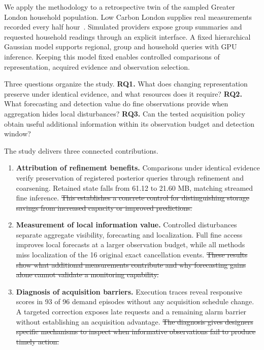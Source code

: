 \documentclass[conference]{IEEEtran}
\providecommand{\DIFdeltex}[1]{{\protect\color{red}\sout{#1}}}                      %
\providecommand{\DIFdelbegin}{} %
\providecommand{\DIFdelend}{} %
\providecommand{\DIFdel}[1]{\texorpdfstring{\DIFdeltex{#1}}{}} %
\begin{document}
We apply the methodology to a retrospective twin of the sampled Greater London household population. Low Carbon London supplies real measurements recorded every half hour~\cite{london}. Simulated providers expose group summaries and requested household readings through an explicit interface. A fixed hierarchical Gaussian model supports regional, group and household queries with GPU inference. Keeping this model fixed enables controlled comparisons of representation, acquired evidence and observation selection.

Three questions organize the study. \textbf{RQ1.} What does changing representation preserve under identical evidence, and what resources does it require? \textbf{RQ2.} What forecasting and detection value do fine observations provide when aggregation hides local disturbances? \textbf{RQ3.} Can the tested acquisition policy obtain useful additional information within its observation budget and detection window?

The study delivers three connected contributions.
\begin{enumerate}
\item \textbf{Attribution of refinement benefits.} Comparisons under identical evidence verify preservation of registered posterior queries through refinement and coarsening. Retained state falls from 61.12 to 21.60 MB, matching streamed fine inference.
\DIFdelbegin \DIFdel{This establishes a concrete control for distinguishing storage savings from increased capacity or improved predictions.
}\DIFdelend \item \textbf{Measurement of local information value.} Controlled disturbances separate aggregate visibility, forecasting and localization. Full fine access improves local forecasts at a larger observation budget, while all methods miss localization of the 16 original exact cancellation events.
\DIFdelbegin \DIFdel{These results show what additional measurements contribute and why forecasting gains alone cannot validate a monitoring capability.
}\DIFdelend \item \textbf{Diagnosis of acquisition barriers.} Execution traces reveal responsive scores in 93 of 96 demand episodes without any acquisition schedule change. A targeted correction exposes late requests and a remaining alarm barrier without establishing an acquisition advantage.
\DIFdelbegin \DIFdel{The diagnosis gives designers specific mechanisms to inspect when informative observations fail to produce timely action.
}\DIFdelend \end{enumerate}
\end{document}
